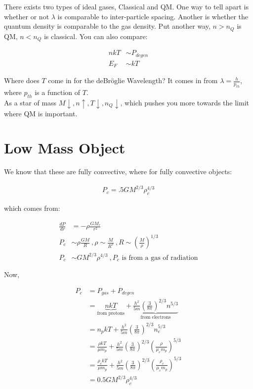 \documentclass[10pt,letterpaper,final]{book}
\newcommand{\rp}{\right)}
\newcommand{\lp}{\left(}
\begin{document}
There exists two types of ideal gases, Classical and QM. One way to tell apart is whether or not $\lambda$ is comparable to inter-particle spacing. Another is whether the quantum density is comparable to the gas density. Put another way, $n > n_Q$ is QM, $n < n_Q$ is classical. You can also compare:

\begin{align}
nkT &\sim P_{degen}\\
E_F& \sim kT
\end{align}

Where does $T$ come in for the deBr\"oglie Wavelength? It comes in from $\lambda = \frac{h}{p_{th}}$, where $p_{th}$ is a function of $T$.\\

As a star of mass $M \downarrow, n\uparrow, T \downarrow, n_Q \downarrow$, which pushes you more towards the limit where QM is important. 

\section{Low Mass Object}

We know that these are fully convective, where for fully convective objects:

\begin{align}
P_c = .5 GM^{2/3}\rho_c^{4/3}
\end{align}

which comes from:

\begin{align}
\frac{dP}{dr} &= -\rho \frac{GM_r}{r^2}\\
P_c &\sim \rho \frac{GM}{R}~,\rho \sim \frac{M}{R^3}~,R \sim \lp \frac{M}{\rho} \rp^{1/3}\\
P_c &\sim GM^{2/3}\rho^{4/3}~,P_c \text{ is from a gas of radiation}
\end{align}

Now,

\begin{align}
P_c &= P_{gas} + P_{degen}\\
&= \underbrace{nkT}_{\text{from protons}} + \underbrace{\frac{h^2}{5m} \lp \frac{3}{8 \pi} \rp^{2/3} n^{5/3}}_{\text{from electrons}}\\
&= n_p kT + \frac{h^2}{5m} \lp \frac{3}{8 \pi} \rp^{2/3} n_e^{5/3}\\
&= \frac{\rho kT}{\mu m_p} + \frac{h^2}{5m} \lp \frac{3}{8 \pi} \rp^{2/3} \lp  \frac{\rho}{\mu_e m_p}\rp^{5/3}\\
&= \frac{\rho_c kT}{\mu m_p} + \frac{h^2}{5m} \lp \frac{3}{8 \pi} \rp^{2/3} \lp  \frac{\rho_c}{\mu_e m_p}\rp^{5/3}\\
&= 0.5 GM^{2/3} \rho_c^{4/3}
\end{align}
\end{document}
